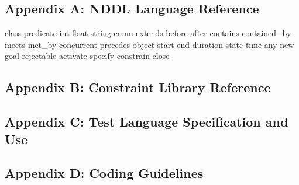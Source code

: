 \documentclass[10pt, letterpaper, twoside]{article}
\begin{document}
\subsection{Appendix A: NDDL Language Reference}
class
predicate
int
float
string
enum
extends
before
after
contains
contained\_by
meets
met\_by
concurrent
precedes
object
start
end
duration
state
time
any
new
goal
rejectable
activate
specify
constrain
close

\subsection{Appendix B: Constraint Library Reference}
\subsection{Appendix C: Test Language Specification and Use}
\subsection{Appendix D: Coding Guidelines}
\end{document}
